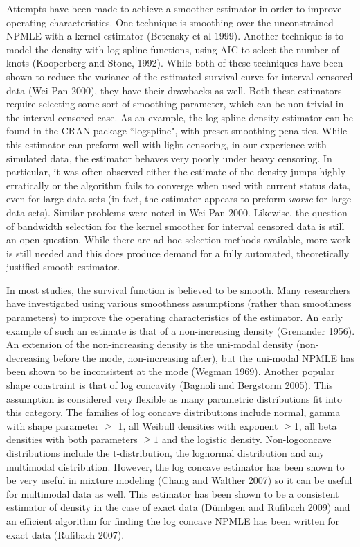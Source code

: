 \documentclass[10pt]{article}
\begin{document}
	Attempts have been made to achieve a smoother estimator in order to improve operating characteristics. One technique is smoothing over the unconstrained NPMLE with a kernel estimator (Betensky et al 1999). Another technique is to model the density with log-spline functions, using AIC to select the number of knots (Kooperberg and Stone, 1992). While both of these techniques have been shown to reduce the variance of the estimated survival curve for interval censored data (Wei Pan 2000), they have their drawbacks as well. Both these estimators require selecting some sort of smoothing parameter, which can be non-trivial in the interval censored case. As an example, the log spline density estimator can be found in the CRAN package  ``logspline", with preset smoothing penalties. While this estimator can preform well with light censoring, in our experience with simulated data, the estimator behaves very poorly under heavy censoring. In particular, it was often observed either the estimate of the density jumps highly erratically or the algorithm fails to converge when used with current status data, even for large data sets (in fact, the estimator appears to preform \emph{worse} for large data sets). Similar problems were noted in Wei Pan 2000.  Likewise, the question of bandwidth selection for the kernel smoother for interval censored data is still an open question. While there are ad-hoc selection methods available, more work is still needed and this does produce demand for a fully automated, theoretically justified smooth estimator.
	
	In most studies, the survival function is believed to be smooth. Many researchers have investigated using various smoothness assumptions (rather than smoothness parameters) to improve the operating characteristics of the estimator. An early example of such an estimate is that of a non-increasing density (Grenander 1956). An extension of the non-increasing density is the uni-modal density (non-decreasing before the mode, non-increasing after), but the uni-modal NPMLE has been shown to be inconsistent at the mode (Wegman 1969). Another popular shape constraint is that of log concavity (Bagnoli and Bergstorm 2005). This assumption is considered very flexible as many parametric distributions fit into this category. The families of log concave distributions include normal, gamma with shape parameter $\ge$ 1, all Weibull densities with exponent $\ge$1, all beta densities with both parameters $\ge 1$ and the logistic density. Non-logconcave distributions include the t-distribution, the lognormal distribution and any multimodal distribution. However, the log concave estimator has been shown to be very useful in mixture modeling (Chang and Walther 2007) so it can be useful for multimodal data as well. This estimator has been shown to be a consistent estimator of density in the case of exact data (D\"umbgen and Rufibach 2009) and an efficient algorithm for finding the log concave NPMLE has been written for exact data (Rufibach 2007). 
	
\end{document}
